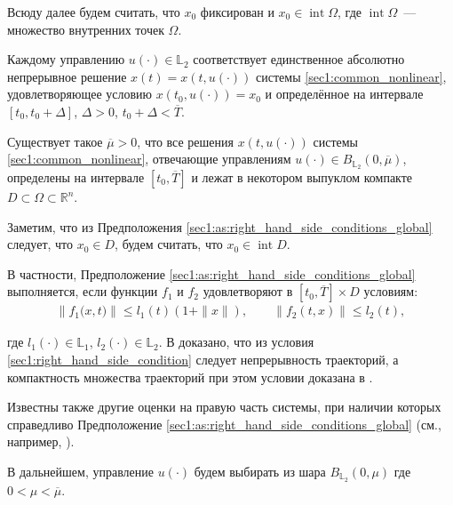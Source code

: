 \documentclass[../main.tex]{subfiles}
\begin{document}
Всюду далее будем считать, что $x_0$ фиксирован и  $x_0 \in \operatorname{int} \Omega $, где $\operatorname{int} \Omega $~--- множество внутренних точек $\Omega$. 
    
Каждому управлению $ u(\cdot) \in \mathbb{L}_2 $ соответствует единственное абсолютно непрерывное решение $ x(t)=x(t,u(\cdot)) $ системы \eqref{sec1:common_nonlinear}, удовлетворяющее условию $ x(t_0, u(\cdot)) = x_0$ и определённое на интервале $ [t_0, t_0 + \Delta] $, $\Delta > 0$, $ t_0 + \Delta < \overline{T}$.

\begin{assumption}\label{sec1:as:right_hand_side_conditions_global}
    Существует такое $\overline{\mu} > 0 $, что все решения $ x(t, u(\cdot)) $ системы \eqref{sec1:common_nonlinear}, отвечающие управлениям $u(\cdot) \in B_{\mathbb{L}_2}(0,\overline{\mu})$,  определены на интервале $ [t_0,\overline{T}] $ и лежат в некотором выпуклом компакте $D \subset \Omega \subset \mathbb{R}^n$. 
\end{assumption}
    
Заметим, что из Предположения  \ref{sec1:as:right_hand_side_conditions_global} следует, что $x_0 \in D$, будем считать, что $x_0 \in \operatorname{int} D$.

В частности, Предположение \ref{sec1:as:right_hand_side_conditions_global} выполняется, если  функции $f_1$ и $f_2$ удовлетворяют в $ [t_0, \overline{T}] \times D$ условиям:
\begin{gather}\label{sec1:right_hand_side_condition}
    \left\|f_1\big(x,t\big) \right\| \leqslant l_1(t) (1 + \|x\|), \qquad  \left\| f_2(t,x) \right\| \leqslant l_2(t), 
\end{gather}
    
где $ l_1(\cdot) \in  \mathbb{L}_1$, $ l_2(\cdot) \in  \mathbb{L}_2$.
В \cite[Теорема 5]{Fillipov2} доказано, что из условия \eqref{sec1:right_hand_side_condition} следует непрерывность траекторий, а компактность множества траекторий при этом условии доказана в \cite[Утверждение 2]{GusZyk}.
    
Известны также другие  оценки на правую часть системы, при наличии которых справедливо Предположение  \ref{sec1:as:right_hand_side_conditions_global} (см., например, \cite{Fillipov2, Guseinov}).
    
В дальнейшем, управление $ u(\cdot) $ будем выбирать из шара $ B_{\mathbb{L}_2}(0,\mu) $ где $ 0 < \mu < \overline{\mu} $.
    
\end{document}
